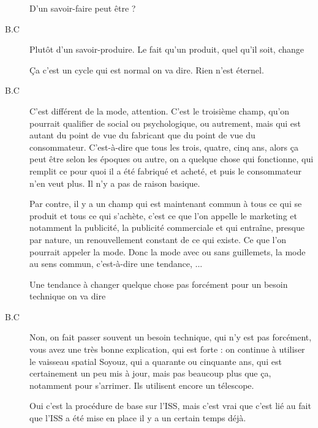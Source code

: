 \begin{description}
D'un savoir-faire peut être ?

\item[B.C] Plutôt d'un savoir-produire. Le fait qu'un produit, quel qu'il soit, change

Ça c'est un cycle qui est normal on va dire. Rien n'est éternel.

\vspace{1\baselineskip}

\item[B.C]C'est différent de la mode, attention. C'est le troisième champ, qu'on pourrait qualifier de social ou psychologique, ou autrement, mais qui est autant du point de vue du fabricant que du point de vue du consommateur. C'est-à-dire que tous les trois, quatre, cinq ans, alors ça peut être selon les époques ou autre, on a quelque chose qui fonctionne, qui remplit ce pour quoi il a été fabriqué et acheté, et puis le consommateur n'en veut plus. Il n'y a pas de raison basique.

Par contre, il y a un champ qui est maintenant commun à tous ce qui se produit et tous ce qui s'achète, c'est ce que l'on appelle le marketing et notamment la publicité, la publicité commerciale et qui entraîne, presque par nature, un renouvellement constant de ce qui existe. Ce que l'on pourrait appeler la mode. Donc la mode avec ou sans guillemets, la mode au sens commun, c'est-à-dire une tendance, ...


\vspace{1\baselineskip}

Une tendance à changer quelque chose pas forcément pour un besoin technique on va dire


\vspace{1\baselineskip}

\item[B.C]Non, on fait passer souvent un besoin technique, qui n'y est pas forcément, vous avez une très bonne explication, qui est forte : on continue à utiliser le vaisseau spatial Soyouz, qui a quarante ou cinquante ans, qui est certainement un peu mis à jour, mais pas beaucoup plus que ça, notamment pour s'arrimer. Ils utilisent encore un télescope.

\vspace{1\baselineskip}

Oui c'est la procédure de base sur l'ISS, mais c'est vrai que c'est lié au fait que l'ISS a été mise en place il y a un certain temps déjà.


\end{description}
